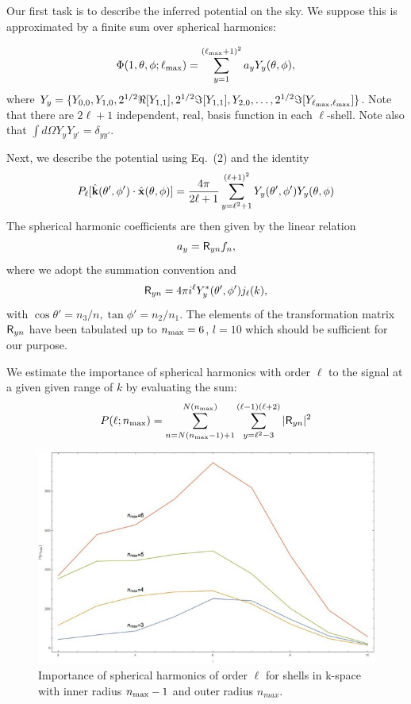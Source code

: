 \documentclass[useAMS,usenatbib,a4paper]{mn2e}
\begin{document}
Our first task is to describe the inferred potential on the sky. We
suppose this is approximated by a finite sum over spherical harmonics:

\begin{equation}
\Phi(1,\theta,\phi;\ell_{\rm max})=\sum_{y=1}^{(\ell_{\rm max}+1)^2}a_yY_y(\theta,\phi),
\end{equation}
where $Y_y=\{Y_{0,0},Y_{1,0},2^{1/2}\Re[Y_{1,1}],2^{1/2}\Im[Y_{1,1}],Y_{2,0},\dots,2^{1/2}\Im[Y_{\ell_{\rm max},\ell_{\rm max}}]\}$. Note that there are $2\ell+1$ independent, real, basis function in each $\ell$-shell. Note also that $\int d\Omega Y_yY_{y'}=\delta_{yy'}$.

Next, we describe the potential using Eq.~(2) and the identity
\begin{equation}
P_{\ell}[\hat{\bf k}(\theta',\phi')\cdot\hat{\bf x}(\theta,\phi)]=\frac{4\pi}{2\ell+1}\sum_{y=\ell^2+1}^{(\ell+1)^2}Y_y(\theta',\phi')Y_y(\theta,\phi)
\end{equation}
The spherical harmonic coefficients are then given by the linear relation
\begin{equation}
a_y=\mathsf{R}_{yn} f_n,
\end{equation}
where we adopt the summation convention and
\begin{equation}
\mathsf{R}_{yn} =4\pi i^\ell Y_y^\ast(\theta',\phi')j_\ell(k),
\end{equation}
with $\cos\theta'=n_3/n,\tan\phi'=n_2/n_1$. The elements of the
transformation matrix $\mathsf{R}_{yn}$ have been tabulated up to $n_{\rm
max}=6$, $l=10$ which should be sufficient for our purpose.

We estimate the importance of spherical harmonics with order $\ell$ to
the signal at a given given range of $k$ by evaluating the sum:
\begin{equation}
P(\ell;n_{\rm max})=\sum_{n=N(n_{\rm max}-1)+1}^{N(n_{\rm max})}\sum_{y=\ell^2-3}^{(\ell-1)(\ell+2)}|\mathsf{R}_{yn}|^2
\end{equation}
\begin{figure}
\centering
\includegraphics[width=0.9\linewidth]{fig6.jpg}
\caption{Importance of spherical harmonics of order $\ell$ for shells
in k-space with inner radius $n_{\rm max}-1$ and outer radius
$n_{max}$.}
\end{figure}
\end{document}
